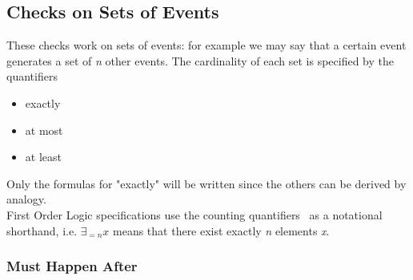 \documentclass[11pt,a4paper,notitlepage]{article}
\begin{document}
\subsection{Checks on Sets of Events}

These checks work on sets of events: for example we may say that a certain event generates a set of \textit{n} other events. The cardinality of each set is specified by the quantifiers
\begin{itemize}
	\item exactly
	\item at most
	\item at least
\end{itemize}
Only the formulas for "exactly" will be written since the others can be derived by analogy.\bigskip \\
First Order Logic specifications use the counting quantifiers~\cite{Pratt-Hartmann:2014:LCE:2603088.2603117} as a notational shorthand, i.e. $\exists_{=n} x$ means that there exist exactly \textit{n} elements \textit{x}.

\subsubsection{Must Happen After}
\end{document}

